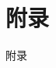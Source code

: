 \thispagestyle{fancy}

\chapter*{\xiaoer\hei\textbf{附\qquad\qquad 录}} %


\begin{spacing}{1.5}
\xiaosi\song
附录
\end{spacing}